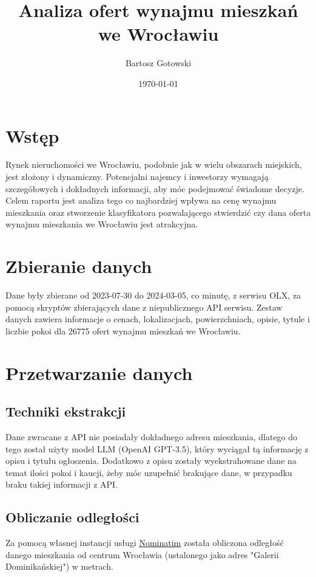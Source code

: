 \documentclass[12pt]{article}
\title{Analiza ofert wynajmu mieszkań we Wrocławiu}
\author{Bartosz Gotowski}
\date{\today}
\begin{document}
\maketitle

\tableofcontents

\pagebreak

\section{Wstęp}
Rynek nieruchomości we Wrocławiu, podobnie jak w wielu obszarach miejskich, jest złożony i dynamiczny. Potencjalni najemcy i inwestorzy wymagają szczegółowych i dokładnych informacji, aby móc podejmować świadome decyzje. Celem raportu jest analiza tego co najbardziej wpływa na cenę wynajmu mieszkania oraz stworzenie klasyfikatora pozwalającego stwierdzić czy dana oferta wynajmu mieszkania we Wrocławiu jest atrakcyjna. 

\section{Zbieranie danych}
Dane były zbierane od 2023-07-30 do 2024-03-05, co minutę, z serwisu OLX, za pomocą skryptów zbierających dane z niepublicznego API serwisu. Zestaw danych zawiera informacje o cenach, lokalizacjach, powierzchniach, opisie, tytule i liczbie pokoi dla 26775 ofert wynajmu mieszkań we Wrocławiu.

\section{Przetwarzanie danych}
\subsection{Techniki ekstrakcji}
Dane zwracane z API nie posiadały dokładnego adresu mieszkania, dlatego do tego został użyty model LLM (OpenAI GPT-3.5), który wyciągał tą informację z opisu i tytułu ogłoszenia. Dodatkowo z opisu zostały wyekstrahowane dane na temat ilości pokoi i kaucji, żeby móc uzupełnić brakujące dane, w przypadku braku takiej informacji z API.


\subsection{Obliczanie odległości}
Za pomocą własnej instancji usługi \href{https://nominatim.org}{Nominatim} została obliczona odległość danego mieszkania od centrum Wrocławia (ustalonego jako adres "Galerii Dominikańskiej") w metrach.
\end{document}
